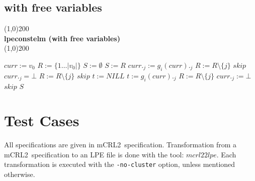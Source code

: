 \index{}\documentclass[a4paper,10pt]{article}
\theoremstyle{plain}
\theoremstyle{definition}
\newcommand{\mcrl}{mCRL2}
\begin{document}
\subsection{with free variables}
\line(1,0){200}\\
\textbf{lpeconstelm (with free variables)}\\
\line(1,0){200}
\begin{algorithmic}[1]
\STATE $curr := v_0$
\STATE $R := \lbrace 1 \ldots \vert v_0 \vert \rbrace $
\STATE $S := \emptyset $
    \STATE $S := R$
              \STATE $ curr._j := g_i(curr)._j $
                \STATE $R:= R \setminus \lbrace j \rbrace $
	      \ENDIF
               \STATE $ skip $
            \ENDIF
              \STATE $curr._j = \bot$
              \STATE $R := R \setminus \lbrace j \rbrace$
              \STATE $skip$
            \ENDIF
          \ENDIF 
        \ENDFOR
    \ENDFOR 
  \ENDWHILE \newline
    \STATE $t:= NILL$
        \STATE $ t := g_i(curr)._j $
        \STATE $ R := R \setminus \lbrace j \rbrace$
        \STATE $ curr._j := \bot $
        \STATE $skip$
      \ENDIF
    \ENDFOR
  \ENDFOR
\ENDWHILE
\RETURN $S$
\end{algorithmic}
\newpage

\section{Test Cases}
All specifications are given in \mcrl\ specification.
Transformation from a \mcrl\ specification to an LPE file is done with the tool:
$mcrl22lpe$. Each transformation is executed with the \verb"-no-cluster" option, unless
mentioned otherwise.
\end{document}
